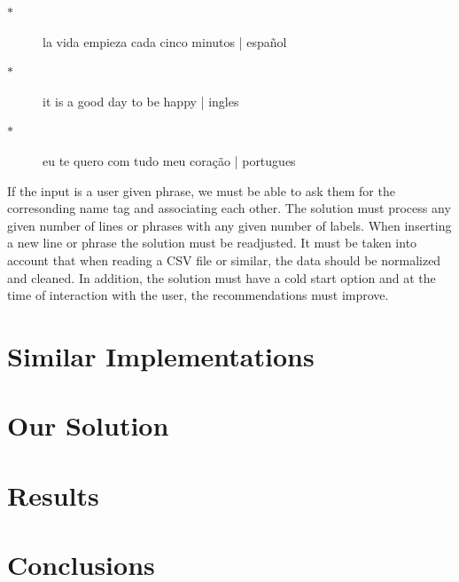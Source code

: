 \documentclass[sigconf,12pt,review=false,natbib=false]{acmart}
\begin{document}
\begin{description}
  \item[$\ast$] la vida empieza cada cinco minutos | español 
  \item[$\ast$] it is a good day to be happy | ingles
  \item[$\ast$] eu te quero com tudo meu coração | portugues
\end{description}

If the input is a user given phrase, we must be able to ask them for the corresonding name tag and associating each 
other.
The solution must process any given number of lines or phrases with any given number of labels. When inserting a new
line or phrase the solution must be readjusted. It must be taken into account that when reading a CSV file or similar,
the data should be normalized and cleaned. In addition, the solution must have a cold start option and at the time
of interaction with the user, the recommendations must improve.


\section{Similar Implementations}

\section{Our Solution}

\section{Results}

\section{Conclusions}

\nocite{*}
\printbibliography
\end{document}
